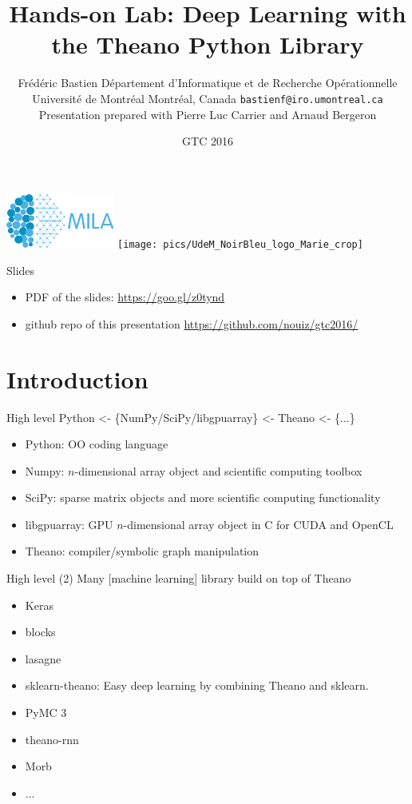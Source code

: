 \documentclass[utf8x,xcolor=pdftex,dvipsnames,table]{beamer}
\title{Hands-on Lab: Deep Learning with the Theano Python Library}
\author{%
\footnotesize
Frédéric Bastien \newline
\newline
\newline
Département d'Informatique et de Recherche Opérationnelle \newline
Université de Montréal \newline
Montréal, Canada \newline
\texttt{bastienf@iro.umontreal.ca} \newline \newline
Presentation prepared with Pierre Luc Carrier and Arnaud Bergeron
}
\date{GTC 2016}
\begin{document}
\begin{frame}[plain]
 \titlepage
 \vspace{-5em}
 \includegraphics[width=1.4in]{pics/mila.png}
 \hfill
 \texttt{[image: pics/UdeM\_NoirBleu\_logo\_Marie\_crop]}
\end{frame}

\begin{frame}{Slides}
\begin{itemize}
 \item PDF of the slides: \url{https://goo.gl/z0tynd}
 \item github repo of this presentation \url{https://github.com/nouiz/gtc2016/}
\end{itemize}
\end{frame}

\section{Introduction}
\begin{frame}
  \tableofcontents[currentsection]
\end{frame}

\begin{frame}{High level}\setcounter{page}{1}
  Python <- \{NumPy/SciPy/libgpuarray\} <- Theano <- \{...\}
  \begin{itemize}
  \item Python: OO coding language
  \item Numpy: $n$-dimensional array object and scientific computing toolbox
  \item SciPy: sparse matrix objects and more scientific computing functionality
  \item libgpuarray: GPU $n$-dimensional array object in C for CUDA and OpenCL
  \item Theano: compiler/symbolic graph manipulation
  \end{itemize}
\end{frame}

\begin{frame}{High level (2)}
  Many [machine learning] library build on top of Theano
  \begin{itemize}
  \item Keras
  \item blocks
  \item lasagne
  \item sklearn-theano: Easy deep learning by combining Theano and sklearn.
  \item PyMC 3
  \item theano-rnn
  \item Morb
  \item ...
  \end{itemize}
\end{frame}
\end{document}
